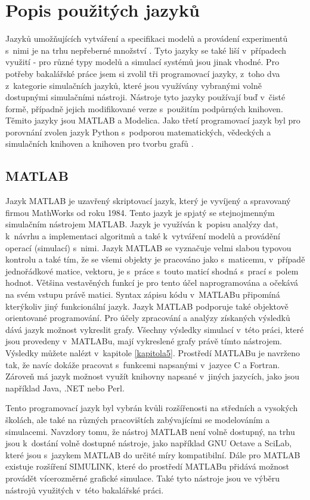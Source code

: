 \section{Popis použitých jazyků}
Jazyků umožňujících vytváření a specifikaci modelů a provádení experimentů s~nimi je na trhu nepřeberné množství \cite{list-of-process-modelling-lang}. Tyto jazyky se také liší v~případech využití - pro různé typy modelů a simulací systémů jsou jinak vhodné. Pro potřeby bakalářské práce jsem si zvolil tři programovací jazyky, z~toho dva z~kategorie simulačních jazyků, které jsou využívány vybranými volně dostupnými simulačními nástroji. Nástroje tyto jazyky používají buď v~čisté formě, případně jejich modifikované verze s~použitím podpůrných knihoven. Těmito jazyky jsou MATLAB\cite{MATLAB:2010} a Modelica\cite{Fritzson02modelica--}. Jako třetí programovací jazyk byl pro porovnání zvolen jazyk Python s~podporou matematických, vědeckých a simulačních knihoven a knihoven pro tvorbu grafů \cite{scipy}.

\subsection{MATLAB}
\label{matlab-lang}
Jazyk MATLAB je uzavřený skriptovací jazyk, který je vyvíjený a spravovaný firmou MathWorks od roku 1984. Tento jazyk je spjatý se stejnojmenným simulačním nástrojem MATLAB. Jazyk je využíván k~popisu analýzy dat, k~návrhu a implementaci algoritmů a také k~vytváření modelů a provádění operací (simulací) s~nimi. Jazyk MATLAB se vyznačuje velmi slabou typovou kontrolu a také tím, že se všemi objekty je pracováno jako s~maticemu, v~případě jednořádkové matice, vektoru, je s~práce s~touto maticí shodná s~prací s~polem hodnot. Většina vestavěných funkcí je pro tento účel naprogramována a očekává na svém vstupu právě matici. Syntax zápisu kódu v~MATLABu připomíná kterýkoliv jiný funkcionální jazyk. Jazyk MATLAB podporuje také objektově orientované programování. Pro účely zpracování a analýzy získaných výsledků dává jazyk možnost vykreslit grafy. Všechny výsledky simulací v~této práci, které jsou provedeny v~MATLABu, mají vykreslené grafy právě tímto nástrojem. Výsledky můžete nalézt v~kapitole \ref{kapitola5}. Prostředí MATLABu je navrženo tak, že navíc dokáže pracovat s~funkcemi napsanými v~jazyce C a Fortran. Zároveň má jazyk možnost využít knihovny napsané v~jiných jazycích, jako jsou například Java, .NET nebo Perl.

Tento programovací jazyk byl vybrán kvůli rozšířenosti na středních a vysokých školách, ale také na různých pracovištích zabývajícími se modelováním a simulacemi. Navzdory tomu, že nástroj MATLAB není volně dostupný, na trhu jsou k~dostání volně dostupné nástroje, jako například GNU Octave a SciLab, které jsou s~jazykem MATLAB do určité míry kompatibilní. Dále pro MATLAB existuje rozšíření SIMULINK, které do prostředí MATLABu přidává možnost provádět vícerozměrné grafické simulace. Také tyto nástroje jsou ve výběru nástrojů využitých v~této bakalářské práci.

